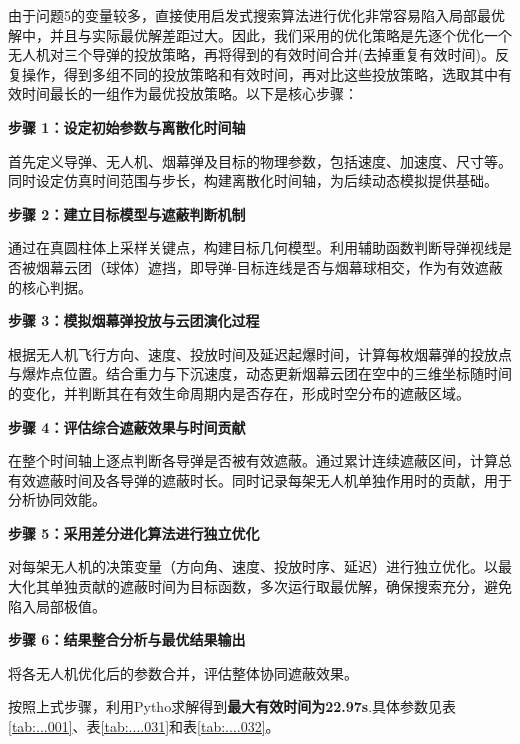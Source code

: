 \documentclass[../main.tex]{subfiles}
\begin{document}

由于问题5的变量较多，直接使用启发式搜索算法进行优化非常容易陷入局部最优解中，并且与实际最优解差距过大。因此，我们采用的优化策略是先逐个优化一个无人机对三个导弹的投放策略，再将得到的有效时间合并(去掉重复有效时间)。反复操作，得到多组不同的投放策略和有效时间，再对比这些投放策略，选取其中有效时间最长的一组作为最优投放策略。以下是核心步骤：

\noindent \textbf{步骤 1：设定初始参数与离散化时间轴}

首先定义导弹、无人机、烟幕弹及目标的物理参数，包括速度、加速度、尺寸等。同时设定仿真时间范围与步长，构建离散化时间轴，为后续动态模拟提供基础。

\noindent \textbf{步骤 2：建立目标模型与遮蔽判断机制} 

通过在真圆柱体上采样关键点，构建目标几何模型。利用辅助函数判断导弹视线是否被烟幕云团（球体）遮挡，即导弹-目标连线是否与烟幕球相交，作为有效遮蔽的核心判据。

\noindent \textbf{步骤 3：模拟烟幕弹投放与云团演化过程} 

根据无人机飞行方向、速度、投放时间及延迟起爆时间，计算每枚烟幕弹的投放点与爆炸点位置。结合重力与下沉速度，动态更新烟幕云团在空中的三维坐标随时间的变化，并判断其在有效生命周期内是否存在，形成时空分布的遮蔽区域。

\noindent \textbf{步骤 4：评估综合遮蔽效果与时间贡献} 

在整个时间轴上逐点判断各导弹是否被有效遮蔽。通过累计连续遮蔽区间，计算总有效遮蔽时间及各导弹的遮蔽时长。同时记录每架无人机单独作用时的贡献，用于分析协同效能。

\noindent \textbf{步骤 5：采用差分进化算法进行独立优化} 

对每架无人机的决策变量（方向角、速度、投放时序、延迟）进行独立优化。以最大化其单独贡献的遮蔽时间为目标函数，多次运行取最优解，确保搜索充分，避免陷入局部极值。

\noindent \textbf{步骤 6：结果整合分析与最优结果输出} 

将各无人机优化后的参数合并，评估整体协同遮蔽效果。

按照上式步骤，利用Pytho求解得到\textbf{最大有效时间为22.97s}.具体参数见表\ref{tab:...001}、表\ref{tab:....031}和表\ref{tab:....032}。
\end{document}
